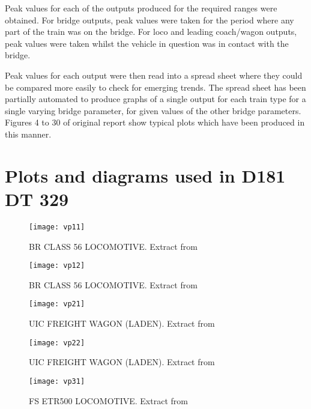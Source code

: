 \begin{appendices}
Peak values for each of the outputs produced for the required ranges were obtained. For bridge outputs, peak values were taken for the period where any part of the train was on the bridge. For loco and leading coach/wagon outputs, peak values were taken whilst the vehicle in question was in contact with the bridge.

Peak values for each output were then read into a spread sheet where they could be compared more easily to check for emerging trends. The spread sheet has been partially automated to produce graphs of a single output for each train type for a single varying bridge parameter, for given values of the other bridge parameters. Figures 4 to 30 of original \citet{d181dt329} report show typical plots which have been produced in this manner.



\chapter{Plots and diagrams used in D181 DT 329}\label{app:dt329data}

\begin{figure}[h]
    \centering
    \texttt{[image: vp11]}
    \caption{BR CLASS 56 LOCOMOTIVE. Extract from \citet[Appendix 2]{d181dt329}}
\end{figure}

\begin{figure}[h]
    \centering
    \texttt{[image: vp12]}
    \caption{BR CLASS 56 LOCOMOTIVE. Extract from \citet[Appendix 2]{d181dt329}}
\end{figure}

\begin{figure}[h]
    \centering
    \texttt{[image: vp21]}
    \caption{UIC FREIGHT WAGON (LADEN). Extract from \citet[Appendix 2]{d181dt329}}
\end{figure}

\begin{figure}[h]
    \centering
    \texttt{[image: vp22]}
    \caption{UIC FREIGHT WAGON (LADEN). Extract from \citet[Appendix 2]{d181dt329}}
\end{figure}

\begin{figure}[h]
    \centering
    \texttt{[image: vp31]}
    \caption{FS ETR500 LOCOMOTIVE. Extract from \citet[Appendix 2]{d181dt329}}
\end{figure}


\end{appendices}
